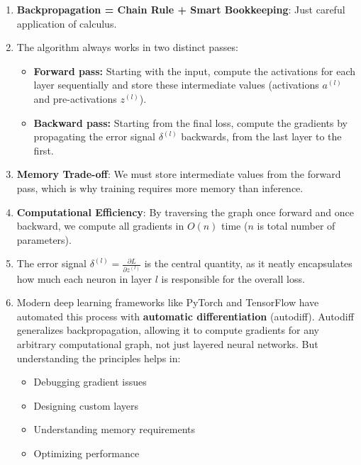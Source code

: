 \documentclass{article}
\begin{document}
\begin{enumerate}
    \item \textbf{Backpropagation = Chain Rule + Smart Bookkeeping}: Just careful application of calculus.
    
    \item The algorithm always works in two distinct passes:
    \begin{itemize}
        \item \textbf{Forward pass:} Starting with the input, compute the activations for each layer sequentially and store these intermediate values (activations $a^{(l)}$ and pre-activations $z^{(l)}$).
        \item \textbf{Backward pass:} Starting from the final loss, compute the gradients by propagating the error signal $\delta^{(l)}$ backwards, from the last layer to the first.
    \end{itemize}
    \item \textbf{Memory Trade-off}: We must store intermediate values from the forward pass, which is why training requires more memory than inference.
    
    \item \textbf{Computational Efficiency}: By traversing the graph once forward and once backward, we compute all gradients in $O(n)$ time ($n$ is total number of parameters).
    
    \item The error signal $\delta^{(l)} = \frac{\partial L}{\partial z^{(l)}}$ is the central quantity, as it neatly encapsulates how much each neuron in layer $l$ is responsible for the overall loss.
    
    \item Modern deep learning frameworks like PyTorch and TensorFlow have automated this process with \textbf{automatic differentiation} (autodiff). Autodiff generalizes backpropagation, allowing it to compute gradients for any arbitrary computational graph, not just layered neural networks. But understanding the principles helps in:
    \begin{itemize}
        \item Debugging gradient issues
        \item Designing custom layers
        \item Understanding memory requirements
        \item Optimizing performance
    \end{itemize}
\end{enumerate}
\end{document}

